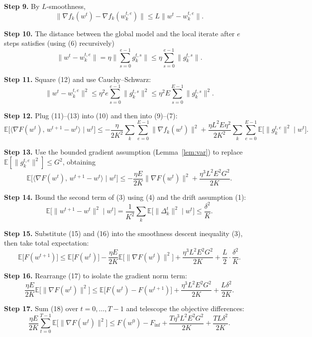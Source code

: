 \documentclass{article}
\begin{document}
\noindent\textbf{Step 9.}  By $L$‑smoothness,
\[
\|\nabla f_k(w^{t})-\nabla f_k(w_{k}^{t,e})\| \le L\|w^{t}-w_{k}^{t,e}\|.
\tag{11}
\]

\noindent\textbf{Step 10.}  The distance between the global model and the
local iterate after $e$ steps satisfies (using (6) recursively)
\[
\|w^{t}-w_{k}^{t,e}\|
= \eta\Big\|\sum_{s=0}^{e-1} g_{k}^{t,s}\Big\|
\le \eta\sum_{s=0}^{e-1}\|g_{k}^{t,s}\|.
\tag{12}
\]

\noindent\textbf{Step 11.}  Square (12) and use Cauchy–Schwarz:
\[
\|w^{t}-w_{k}^{t,e}\|^{2}
\le \eta^{2}e\sum_{s=0}^{e-1}\|g_{k}^{t,s}\|^{2}
\le \eta^{2}E\sum_{s=0}^{E-1}\|g_{k}^{t,s}\|^{2}.
\tag{13}
\]

\noindent\textbf{Step 12.}  Plug (11)–(13) into (10) and then into (9)–(7):
\[
\mathbb{E}\!\big[\big\langle\nabla F(w^{t}),\,w^{t+1}-w^{t}\big\rangle\mid w^{t}\big]
\le
-\frac{\eta}{2K^{2}}\sum_{k}\sum_{e=0}^{E-1}
\|\nabla f_k(w^{t})\|^{2}
+\frac{\eta L^{2}E\eta^{2}}{2K^{2}}\sum_{k}\sum_{e=0}^{E-1}\mathbb{E}\!\big[\|g_{k}^{t,e}\|^{2}\mid w^{t}\big].
\tag{14}
\]

\noindent\textbf{Step 13.}  Use the bounded gradient assumption (Lemma~\ref{lem:var})
to replace $\mathbb{E}[\|g_{k}^{t,e}\|^{2}] \le G^{2}$, obtaining
\[
\mathbb{E}\!\big[\big\langle\nabla F(w^{t}),\,w^{t+1}-w^{t}\big\rangle\mid w^{t}\big]
\le
-\frac{\eta E}{2K}\|\nabla F(w^{t})\|^{2}
+\frac{\eta^{3}L^{2}E^{2}G^{2}}{2K}.
\tag{15}
\]

\noindent\textbf{Step 14.}  Bound the second term of (3) using (4) and the drift
assumption (1):
\[
\mathbb{E}\!\big[\|w^{t+1}-w^{t}\|^{2}\mid w^{t}\big]
= \frac{1}{K^{2}}\sum_{k}\mathbb{E}\!\big[\|\Delta_{k}^{t}\|^{2}\mid w^{t}\big]
\le \frac{\delta^{2}}{K}.
\tag{16}
\]

\noindent\textbf{Step 15.}  Substitute (15) and (16) into the smoothness descent
inequality (3), then take total expectation:
\[
\mathbb{E}\!\big[F(w^{t+1})\big]
\le
\mathbb{E}\!\big[F(w^{t})\big]
-\frac{\eta E}{2K}\mathbb{E}\!\big[\|\nabla F(w^{t})\|^{2}\big]
+\frac{\eta^{3}L^{2}E^{2}G^{2}}{2K}
+\frac{L}{2}\cdot\frac{\delta^{2}}{K}.
\tag{17}
\]

\noindent\textbf{Step 16.}  Rearrange (17) to isolate the gradient norm term:
\[
\frac{\eta E}{2K}\mathbb{E}\!\big[\|\nabla F(w^{t})\|^{2}\big]
\le
\mathbb{E}\!\big[F(w^{t})-F(w^{t+1})\big]
+\frac{\eta^{3}L^{2}E^{2}G^{2}}{2K}
+\frac{L\delta^{2}}{2K}.
\tag{18}
\]

\noindent\textbf{Step 17.}  Sum (18) over $t=0,\dots,T-1$ and telescope the
objective differences:
\[
\frac{\eta E}{2K}\sum_{t=0}^{T-1}\mathbb{E}\!\big[\|\nabla F(w^{t})\|^{2}\big]
\le
F(w^{0})-F_{\inf}
+\frac{T\eta^{3}L^{2}E^{2}G^{2}}{2K}
+\frac{TL\delta^{2}}{2K}.
\tag{19}
\]
\end{document}
